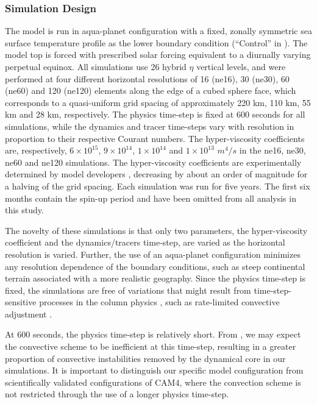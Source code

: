 \subsubsection{Simulation Design}
The model is run in aqua-planet configuration with a fixed, zonally symmetric sea surface temperature profile as the lower boundary condition (“Control” in \cite{NH2000ASL}). The model top is forced with prescribed solar forcing equivalent to a diurnally varying perpetual equinox. All simulations use 26 hybrid $\eta$ vertical levels, and were performed at four different horizontal resolutions of 16 (ne16), 30 (ne30), 60 (ne60) and 120 (ne120) elements along the edge of a cubed sphere face, which corresponds to a quasi-uniform grid spacing of approximately 220 km, 110 km, 55 km and 28 km, respectively. The physics time-step is fixed at 600 seconds for all simulations, while the dynamics and tracer time-steps vary with resolution in proportion to their respective Courant numbers. The hyper-viscosity coefficients are, respectively, $6 \times 10^{15}$, $9 \times 10^{14}$, $1 \times 10^{14}$ and $1 \times 10^{13}$ $m^4/s$ in the ne16, ne30, ne60 and ne120 simulations. The hyper-viscosity coefficients are experimentally determined by model developers \citep[e.g.,][]{B1991JCLIM}, decreasing by about an order of magnitude for a halving of the grid spacing. Each simulation was run for five years. The first six months contain the spin-up period and have been omitted from all analysis in this study.

The novelty of these simulations is that only two parameters, the hyper-viscosity coefficient and the dynamics/tracers time-step, are varied as the horizontal resolution is varied. Further, the use of an aqua-planet configuration minimizes any resolution dependence of the boundary conditions, such as steep continental terrain associated with a more realistic geography. Since the physics time-step is fixed, the simulations are free of variations that might result from time-step-sensitive processes in the column physics \citep{WETAL2015JAMES}, such as rate-limited convective adjustment \citep{W2013QJRMS}. 

At 600 seconds, the physics time-step is relatively short. From \cite{W2013QJRMS}, we may expect the convective scheme to be inefficient at this time-step, resulting in a greater proportion of convective instabilities removed by the dynamical core in our simulations. It is important to distinguish our specific model configuration from scientifically validated configurations of CAM4, where the convection scheme is not restricted through the use of a longer physics time-step.

